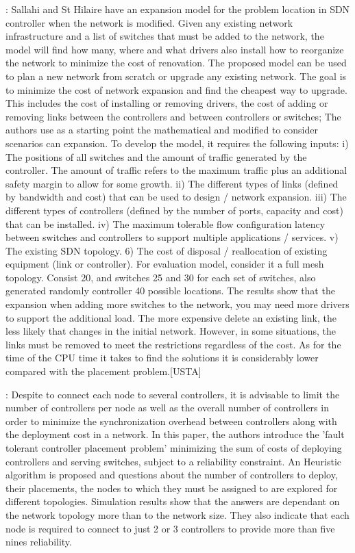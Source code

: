 \documentclass[a4paper,10pt]{article}
\begin{document}
\cite{SaHi17}: Sallahi and St Hilaire have an expansion model for the problem location in SDN controller when the network is modified. Given any existing network infrastructure and a list of switches that must be added to the network, the model will find how many, where and what drivers also install how to reorganize the network to minimize the cost of renovation. The proposed model can be used to plan a new network from scratch or upgrade any existing network. The goal is to minimize the cost of network expansion and find the cheapest way to upgrade. This includes the cost of installing or removing drivers, the cost of adding or removing links between the controllers and between controllers or switches;
The authors use as a starting point the mathematical and modified to consider scenarios can expansion. To develop the model, it requires the following inputs: i) The positions of all switches and the amount of traffic generated by the controller. The amount of traffic refers to the maximum traffic plus an additional safety margin to allow for some growth. ii) The different types of links (defined by bandwidth and cost) that can be used to design / network expansion. iii) The different types of controllers (defined by the number of ports, capacity and cost) that can be installed. iv) The maximum tolerable flow configuration latency between switches and controllers to support multiple applications / services. v) The existing SDN topology.
6) The cost of disposal / reallocation of existing equipment (link or controller).
For evaluation model, consider it a full mesh topology. Consist 20, and switches 25 and 30 for each set of switches, also generated randomly controller 40 possible locations. The results show that the expansion when adding more switches to the network, you may need more drivers to support the additional load. The more expensive delete an existing link, the less likely that changes in the initial network. However, in some situations, the links must be removed to meet the restrictions regardless of the cost. As for the time of the CPU time it takes to find the solutions it is considerably lower compared with the placement problem.[USTA]

\cite{RoRu14}: Despite to connect each node to several controllers, it is advisable to limit the number of controllers per node as well as the overall number of controllers in order to minimize the synchronization overhead between controllers  along with the deployment cost in a network. In this paper, the authors introduce the 'fault tolerant controller placement problem' minimizing the sum of costs of deploying controllers and serving switches, subject to a reliability constraint. An Heuristic algorithm is proposed and questions about the number of controllers to deploy, their placements, the nodes to which they must be assigned to are explored for different topologies. Simulation results show that the answers are dependant on the network topology more than to the network size. They also indicate that each node is required to connect to just 2 or 3 controllers to provide more than five nines reliability.
\end{document}
